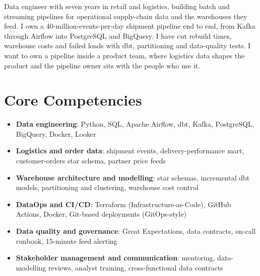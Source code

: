 \documentclass[11pt,a4paper,sans]{moderncv}
\begin{document}
\makecvtitle

\vspace{6pt}
\small{Data engineer with seven years in retail and logistics, building batch and streaming pipelines for operational supply-chain data and the warehouses they feed. I own a 40-million-events-per-day shipment pipeline end to end, from Kafka through Airflow into PostgreSQL and BigQuery. I have cut rebuild times, warehouse costs and failed loads with dbt, partitioning and data-quality tests. I want to own a pipeline inside a product team, where logistics data shapes the product and the pipeline owner sits with the people who use it.}

\section{Core Competencies}
\vspace{4pt}
\begin{itemize}
\item \textbf{Data engineering}: Python, SQL, Apache Airflow, dbt, Kafka, PostgreSQL, BigQuery, Docker, Looker
\item \textbf{Logistics and order data}: shipment events, delivery-performance mart, customer-orders star schema, partner price feeds
\item \textbf{Warehouse architecture and modelling}: star schemas, incremental dbt models, partitioning and clustering, warehouse cost control
\item \textbf{DataOps and CI/CD}: Terraform (Infrastructure-as-Code), GitHub Actions, Docker, Git-based deployments (GitOps-style)
\item \textbf{Data quality and governance}: Great Expectations, data contracts, on-call runbook, 15-minute feed alerting
\item \textbf{Stakeholder management and communication}: mentoring, data-modelling reviews, analyst training, cross-functional data contracts
\end{itemize}
\end{document}
